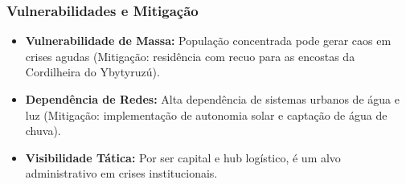 \subsubsection{Vulnerabilidades e
Mitigação}

\begin{itemize}
\tightlist
\item
  \textbf{Vulnerabilidade de Massa:} População concentrada pode gerar
  caos em crises agudas (Mitigação: residência com recuo para as
  encostas da Cordilheira do Ybytyruzú).
\item
  \textbf{Dependência de Redes:} Alta dependência de sistemas urbanos de
  água e luz (Mitigação: implementação de autonomia solar e captação de
  água de chuva).
\item
  \textbf{Visibilidade Tática:} Por ser capital e hub logístico, é um
  alvo administrativo em crises institucionais.
\end{itemize}

